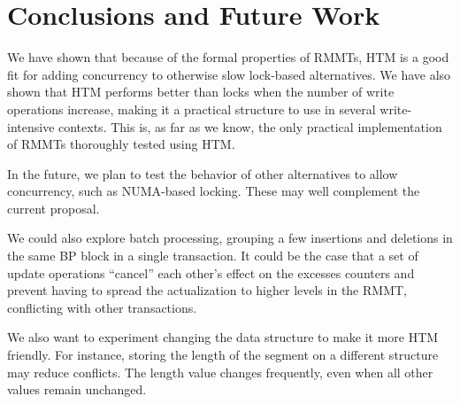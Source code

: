 \documentclass{llncs}
\begin{document}
\section{Conclusions and Future Work}
\vspace{-4mm}

We have shown that because of the formal properties of RMMTs, HTM is a good fit for adding concurrency to otherwise slow lock-based alternatives. We have also shown that HTM performs better than locks when the number of write operations increase, making it a practical structure to use in several write-intensive contexts. This is, as far as we know, the only practical implementation of RMMTs thoroughly tested using HTM.

In the future, we plan to test the behavior of other alternatives to allow concurrency, such as NUMA-based locking. These may well complement the current proposal. 

We could also explore batch processing, grouping a few insertions and deletions in the same BP block in a single transaction. It could be the case that a set of update operations ``cancel'' each other's effect on the excesses counters and prevent having to spread the actualization to higher levels in the RMMT, conflicting with other transactions. 

We also want to experiment changing the data structure to make it more HTM friendly. For instance, storing the length of the segment on a different structure may reduce conflicts. The length value changes frequently, even when all other values remain unchanged.



\end{document}
